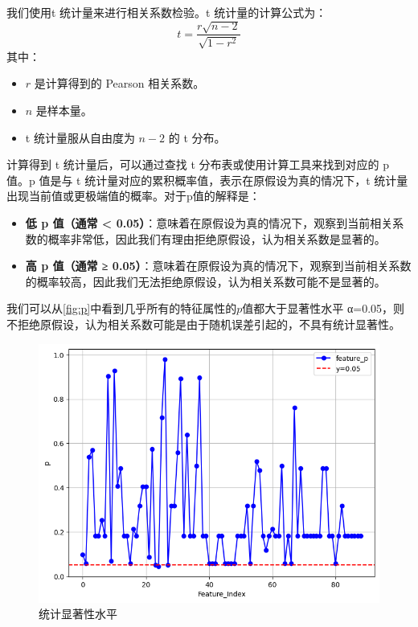 我们使用t 统计量来进行相关系数检验。t 统计量的计算公式为：
\begin{equation}
t = \frac{r \sqrt{n - 2}}{\sqrt{1 - r^2}}
\label{eq:t}
\end{equation}
其中：
\begin{itemize}
    \item \(r\) 是计算得到的 Pearson 相关系数。
    \item \(n\) 是样本量。
    \item t 统计量服从自由度为 \(n - 2\) 的 t 分布。
\end{itemize}
计算得到 t 统计量后，可以通过查找 t 分布表或使用计算工具来找到对应的 p 值。p 值是与 t 统计量对应的累积概率值，表示在原假设为真的情况下，t 统计量出现当前值或更极端值的概率。对于p值的解释是：
\begin{itemize}
    \item \textbf{低 p 值（通常 < 0.05）}：意味着在原假设为真的情况下，观察到当前相关系数的概率非常低，因此我们有理由拒绝原假设，认为相关系数是显著的。
    \item \textbf{高 p 值（通常 ≥ 0.05）}：意味着在原假设为真的情况下，观察到当前相关系数的概率较高，因此我们无法拒绝原假设，认为相关系数可能不是显著的。
\end{itemize}
我们可以从\autoref{fig:p}中看到几乎所有的特征属性的$p$值都大于显著性水平
α=0.05，则不拒绝原假设，认为相关系数可能是由于随机误差引起的，不具有统计显著性。
\begin{figure}[H]
    \centering
    \includegraphics[width=1\linewidth]{figures/p.png}
    \caption{统计显著性水平}
    \label{fig:p}
\end{figure}



